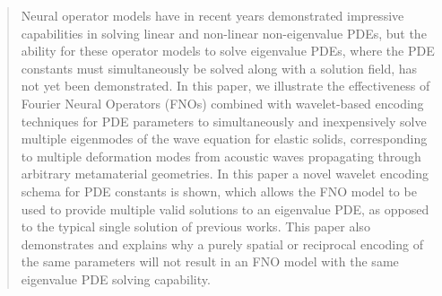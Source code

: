 \documentclass[preprint,review,12pt]{elsarticle}
\begin{document}
\begin{frontmatter}
\author[Mech]{Han Zhang}
\author[Comp]{Cynthia Rudin}
\author[Mech]{Johann Guilleminot}
\author[Mech]{L. Catherine Brinson}
\begin{abstract}
Neural operator models have in recent years demonstrated impressive capabilities in solving linear and non-linear non-eigenvalue PDEs, but the ability for these operator models to solve eigenvalue PDEs, where the PDE constants must simultaneously be solved along with a solution field, has not yet been demonstrated. In this paper, we illustrate the effectiveness of Fourier Neural Operators (FNOs) combined with wavelet-based encoding techniques for PDE parameters to simultaneously and inexpensively solve multiple eigenmodes of the wave equation for elastic solids, corresponding to multiple deformation modes from acoustic waves propagating through arbitrary metamaterial geometries. In this paper a novel wavelet encoding schema for PDE constants is shown, which allows the FNO model to be used to provide multiple valid solutions to an eigenvalue PDE, as opposed to the typical single solution of previous works. This paper also demonstrates and explains why a purely spatial or reciprocal encoding of the same parameters will not result in an FNO model with the same eigenvalue PDE solving capability.

\end{abstract}




\end{frontmatter}
\end{document}
